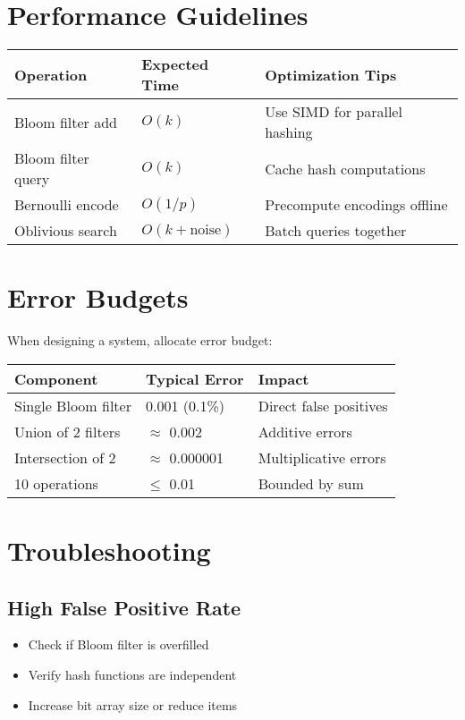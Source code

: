 \section{Performance Guidelines}

\begin{center}
\begin{tabular}{|l|l|l|}
\hline
\textbf{Operation} & \textbf{Expected Time} & \textbf{Optimization Tips} \\
\hline
Bloom filter add & $O(k)$ & Use SIMD for parallel hashing \\
Bloom filter query & $O(k)$ & Cache hash computations \\
Bernoulli encode & $O(1/p)$ & Precompute encodings offline \\
Oblivious search & $O(k + \text{noise})$ & Batch queries together \\
\hline
\end{tabular}
\end{center}

\section{Error Budgets}

When designing a system, allocate error budget:

\begin{center}
\begin{tabular}{|l|l|l|}
\hline
\textbf{Component} & \textbf{Typical Error} & \textbf{Impact} \\
\hline
Single Bloom filter & 0.001 (0.1\%) & Direct false positives \\
Union of 2 filters & $\approx$ 0.002 & Additive errors \\
Intersection of 2 & $\approx$ 0.000001 & Multiplicative errors \\
10 operations & $\leq$ 0.01 & Bounded by sum \\
\hline
\end{tabular}
\end{center}

\section{Troubleshooting}

\subsection{High False Positive Rate}
\begin{itemize}
\item Check if Bloom filter is overfilled
\item Verify hash functions are independent
\item Increase bit array size or reduce items
\end{itemize}

